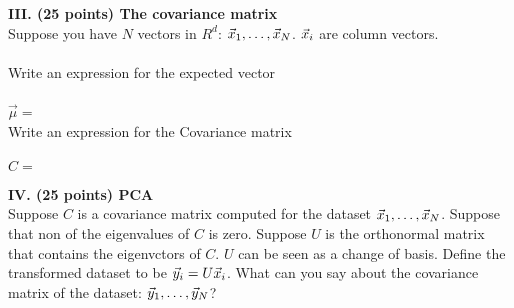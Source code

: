 \documentclass[10pt]{article}
\begin{document}
\vspace{.1in}
\noindent
{\bf III. (25 points) The covariance matrix}\\
Suppose you have $N$ vectors in $R^d$: $\vec{x}_1,\ldots,\vec{x}_N$. $\vec{x}_i$
are column vectors.\\
~\\
Write an expression for the expected vector\\
~\\
\underline{$\vec{\mu} = $\hspace{6in}}
~\\
Write an expression for the Covariance matrix\\
~\\
\underline{$C = $\hspace{6in}}

\vspace{.1in}
\noindent
{\bf IV. (25 points)  PCA} \\
Suppose $C$ is a covariance matrix computed for the dataset
$\vec{x}_1,\ldots,\vec{x}_N$. Suppose that non of the eigenvalues of $C$ is
zero. Suppose $U$ is the orthonormal matrix
that contains the eigenvctors of $C$. $U$ can be seen as a change of
basis. Define the transformed dataset to be $\vec{y}_i = U \vec{x}_i$. What
can you say about the covariance matrix of the dataset:
$\vec{y}_1,\ldots,\vec{y}_N$?\\
~\\
\underline{\hspace{6in}}
\end{document}

